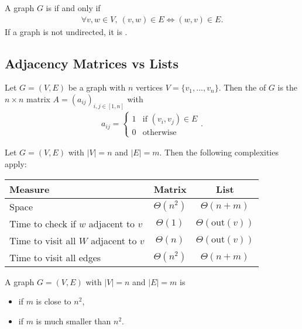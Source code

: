 \documentclass{article}
\begin{document}
\begin{definition}
	A graph $G$ is  if and only if
	\begin{align*}
		\forall v,w\in V,\: (v,w)\in E \Leftrightarrow (w,v)\in E.
	\end{align*}
	If a graph is not undirected, it is .
\end{definition}

\subsection{Adjacency Matrices vs Lists}

\begin{definition}
	Let $G=(V,E)$ be a graph with $n$ vertices $V=\{v_1, ..., v_n\}$.
	Then the  of $G$ is the $n\times n$ matrix
	$A=(a_{ij})_{i,j\in[1,n]}$ with 
	\begin{align*}
		a_{ij} = \begin{cases}
			1 &\text{if } (v_i,v_j)\in E\\
			0 &\text{otherwise}
		\end{cases}.
	\end{align*}
\end{definition}

\begin{theorem}
	Let $G=(V,E)$ with $|V|=n$ and $|E|=m$. Then the following 
	complexities apply:
	\begin{center}
	\begin{tabular}{| l | c | c |}
		\hline
		 Measure & Matrix & List\\
		\hline
		Space & $\Theta(n^2)$ & $\Theta(n+m)$ \\
		\hline
		Time to check if $w$ adjacent to $v$ & $\Theta(1)$ & $\Theta(\text{out}(v))$\\
		\hline
		Time to visit all $W$ adjacent to $v$ & $\Theta(n)$ & $\Theta(\text{out}(v))$\\
		\hline
		Time to visit all edges & $\Theta(n^2)$ & $\Theta(n+m)$\\
		\hline
	\end{tabular}
\end{center}
\begin{lemma}
	A graph $G=(V,E)$ with $|V|=n$ and $|E|=m$ is
	\begin{itemize}
		\item {} if $m$ is close to $n^2$,
		\item {} if $m$ is much smaller than $n^2$. 
	\end{itemize}
\end{lemma}
\end{theorem}
\end{document}
